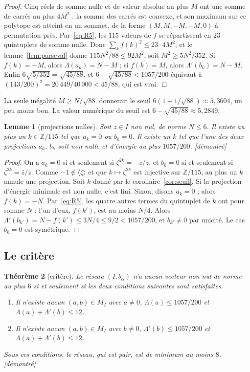 \documentclass[11pt,a4paper]{amsart}
\theoremstyle{plain}
\newtheorem{theoreme}{Théorème}[section]
\newtheorem{lemme}[theoreme]{Lemme}
\theoremstyle{definition}
\numberwithin{equation}{section}
\newcommand{\Z}{\mathbb{Z}}
\newcommand{\st}[1]{\textup{\textsf{\small[#1]}}}
\newcommand{\DEM}{\st{démontré}}
\begin{document}
\begin{proof}
Cinq réels de somme nulle et de valeur absolue au plus $M$ ont une somme de carrés au plus $4M^2$ : la somme des carrés est convexe, et son maximum sur ce polytope est atteint en un sommet, de la forme $(M,M,-M,-M,0)$ à permutation près. Par~\eqref{eq:R5}, les $115$ valeurs de $f$ se répartissent en $23$ quintuplets de somme nulle. Donc $\sum_kf(k)^2\le23\cdot4M^2$, et le lemme~\ref{lem:parseval} donne $115N^2/88\le92M^2$, soit $M^2\ge5N^2/352$. Si $f(k)=-M$, alors $\Lambda(a_k)=N-M$ ; si $f(k)=M$, alors $\Lambda'(b_k)=N-M$. Enfin $6\sqrt{5/352}=\sqrt{45/88}$, et $6-\sqrt{45/88}<1057/200$ équivaut à $(143/200)^2=20\,449/40\,000<45/88$, qui est vrai.
\end{proof}

La seule inégalité $M\ge N/\sqrt{88}$ donnerait le seuil $6(1-1/\sqrt{88})\approx5{,}3604$, un peu moins bon. La valeur numérique du seuil est $6-\sqrt{45/88}\approx5{,}2849$.

\begin{lemme}[projections nulles]\label{lem:nul}
Soit $z\in I$ non nul, de norme $N\le6$. Il existe au plus un $k\in\Z/115$ tel que $a_k=0$ ou $b_k=0$. Il existe un $k$ tel que l'une des deux projections $a_k$, $b_k$ soit \emph{non nulle} et d'énergie au plus $1057/200$. \DEM
\end{lemme}

\begin{proof}
On a $a_k=0$ si et seulement si $\zeta^{2k}=-\bar z/z$, et $b_k=0$ si et seulement si $\zeta^{2k}=\bar z/z$. Comme $-1\notin\langle\zeta\rangle$ et que $k\mapsto\zeta^{2k}$ est injective sur $\Z/115$, au plus un $k$ annule une projection. Soit $k$ donné par le corollaire~\ref{cor:seuil}. Si la projection d'énergie minimale est non nulle, c'est fini. Sinon, disons $a_k=0$ ; alors $f(k)=-N$. Par~\eqref{eq:R5}, les quatre autres termes du quintuplet de $k$ ont pour somme $N$ ; l'un d'eux, $f(k')$, est au moins $N/4$. Alors $\Lambda'(b_{k'})=N-f(k')\le3N/4\le9/2<1057/200$, et $b_{k'}\ne0$ par unicité. Le cas $b_k=0$ est symétrique.
\end{proof}

\subsection{Le critère}

\begin{theoreme}[critère]\label{thm:critere}
Le réseau $(I,b_\alpha)$ n'a aucun vecteur non nul de norme au plus $6$ si et seulement si les deux conditions suivantes sont satisfaites.
\begin{enumerate}[label=\textup{(C\arabic*)}]
\item Il n'existe aucun $(a,b)\in M_I$ avec $a\ne0$, $\Lambda(a)\le1057/200$ et $\Lambda(a)+\Lambda'(b)\le12$.
\item Il n'existe aucun $(a,b)\in M_I$ avec $b\ne0$, $\Lambda'(b)\le1057/200$ et $\Lambda(a)+\Lambda'(b)\le12$.
\end{enumerate}
Sous ces conditions, le réseau, qui est pair, est de minimum au moins $8$. \DEM
\end{theoreme}
\end{document}
